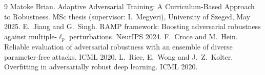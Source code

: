 \documentclass[11pt]{article}
\begin{document}
\begin{thebibliography}{9}
 Matoke Brian. Adaptive Adversarial Training: A Curriculum-Based Approach to Robustness. MSc thesis (supervisor: I.~Megyeri), University of Szeged, May 2025.
 E.~Jiang and G.~Singh. RAMP framework: Boosting adversarial robustness against multiple-$\ell_p$ perturbations. NeurIPS 2024.
 F.~Croce and M.~Hein. Reliable evaluation of adversarial robustness with an ensemble of diverse parameter-free attacks. ICML 2020.
 L.~Rice, E.~Wong and J.~Z.~Kolter. Overfitting in adversarially robust deep learning. ICML 2020.
\end{thebibliography}
\end{document}
